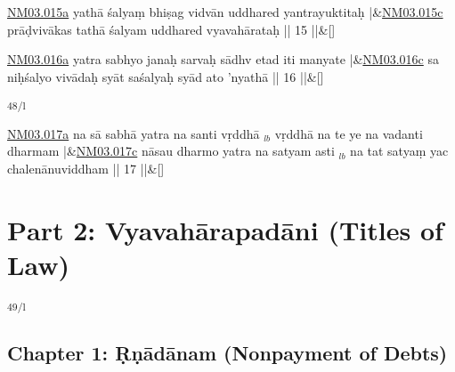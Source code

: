 \documentclass[article,12pt,a4paper]{memoir}%
\begin{document}
	  
	  
	    
	    \stanza[\smallbreak]
	  \href{http://sarit.indology.info/?cref=n\%C4\%81sm-m.03.015a}{NM03.015a} yathā śalyaṃ bhiṣag vidvān uddhared yantrayuktitaḥ |&\href{http://sarit.indology.info/?cref=n\%C4\%81sm-m.03.015c}{NM03.015c} prāḍvivākas tathā śalyam uddhared vyavahārataḥ || 15 ||\&[\smallbreak]
	  
	  
	  
	    
	    \stanza[\smallbreak]
	  \href{http://sarit.indology.info/?cref=n\%C4\%81sm-m.03.016a}{NM03.016a} yatra sabhyo janaḥ sarvaḥ sādhv etad iti manyate |&\href{http://sarit.indology.info/?cref=n\%C4\%81sm-m.03.016c}{NM03.016c} sa niḥśalyo vivādaḥ syāt saśalyaḥ syād ato 'nyathā || 16 ||\&[\smallbreak]
	  
	  
	  \textsuperscript{\textenglish{48/l}}
	    
	    \stanza[\smallbreak]
	  \href{http://sarit.indology.info/?cref=n\%C4\%81sm-m.03.017a}{NM03.017a} na sā sabhā yatra na santi vṛddhā {\tiny $_{lb}$} vṛddhā na te ye na vadanti dharmam |&\href{http://sarit.indology.info/?cref=n\%C4\%81sm-m.03.017c}{NM03.017c} nāsau dharmo yatra na satyam asti {\tiny $_{lb}$} na tat satyaṃ yac chalenānuviddham || 17 ||\&[\smallbreak]
	  
	  
	  
	    
	    \endnumbering%
	    \endgroup
	    
	  
	  
	
	    
	    \begingroup
	    \beginnumbering%
	    
	  
\part{{\protect\textenglish Part 2: Vyavahārapadāni (Titles of Law)}}\textsuperscript{\textenglish{49/l}}
	  
	
\chapter[{Chapter 1: Ṛṇādānam (Nonpayment of Debts)}][{Chapter 1: Ṛṇādānam (Nonpayment of Debts)}]{{\protect\textenglish Chapter 1: Ṛṇādānam (Nonpayment of Debts)}}
	    
\end{document}
